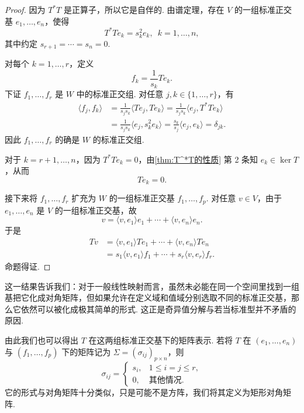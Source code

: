 \begin{proof}
    因为 $T^*T$ 是正算子，所以它是自伴的. 由谱定理，存在 $V$ 的一组标准正交基 $e_1, \ldots, e_n$，使得
    \[
        T^*Te_k = s_k^2 e_k,\enspace k = 1, \ldots, n,
    \]
    其中约定 $s_{r+1} = \cdots = s_n = 0$.

    对每个 $k = 1, \ldots, r$，定义
    \[
        f_k = \frac{1}{s_k}Te_k.
    \]
    下证 $f_1, \ldots, f_r$ 是 $W$ 中的标准正交组. 对任意 $j, k \in \{1, \ldots, r\}$，有
    \begin{align*}
        \langle f_j, f_k \rangle
         & = \frac{1}{s_j s_k}\langle Te_j, Te_k \rangle
          = \frac{1}{s_j s_k}\langle e_j, T^*Te_k \rangle \\
         & = \frac{1}{s_j s_k}\langle e_j, s_k^2 e_k \rangle
          = \frac{s_k}{s_j}\langle e_j, e_k \rangle
          = \delta_{jk}.
    \end{align*}
    因此 $f_1, \ldots, f_r$ 的确是 $W$ 的标准正交组.

    对于 $k = r+1, \ldots, n$，因为 $T^*Te_k = 0$，由\autoref{thm:T^*T的性质} 第 2 条知 $e_k \in \ker T$，从而
    \[
        Te_k = 0.
    \]

    接下来将 $f_1, \ldots, f_r$ 扩充为 $W$ 的一组标准正交基 $f_1, \ldots, f_p$. 对任意 $v \in V$，由于 $e_1, \ldots, e_n$ 是 $V$ 的一组标准正交基，故
    \[
        v = \langle v, e_1 \rangle e_1 + \cdots + \langle v, e_n \rangle e_n.
    \]
    于是
    \begin{align*}
        Tv
         & = \langle v, e_1 \rangle Te_1 + \cdots + \langle v, e_n \rangle Te_n \\
         & = s_1 \langle v, e_1 \rangle f_1 + \cdots + s_r \langle v, e_r \rangle f_r.
    \end{align*}
    命题得证.
\end{proof}

这一结果告诉我们：对于一般线性映射而言，虽然未必能在同一个空间里找到一组基把它化成对角矩阵，但如果允许在定义域和值域分别选取不同的标准正交基，那么它依然可以被化成极其简单的形式. 这正是奇异值分解与若当标准型并不矛盾的原因.

由此我们也可以得出 $T$ 在这两组标准正交基下的矩阵表示. 若将 $T$ 在 $(e_1, \ldots, e_n)$ 与 $(f_1, \ldots, f_p)$ 下的矩阵记为 $\Sigma = (\sigma_{ij})_{p \times n}$，则
\[
    \sigma_{ij} =
    \begin{cases}
        s_i, & 1 \leqslant i = j \leqslant r, \\
        0,   & \text{其他情况}.
    \end{cases}
\]
它的形式与对角矩阵十分类似，只是可能不是方阵，我们将其定义为矩形对角矩阵.

